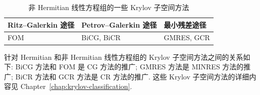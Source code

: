 \begin{table}[H]
\centering
\caption{非 Hermitian 线性方程组的一些 Krylov 子空间方法}\label{tab:nonhermitian-krylov-methods}
\begin{tabular}{lll}\hline
Ritz--Galerkin 途径 & Petrov--Galerkin 途径 & 最小残差途径\\\hline
FOM & BiCG, BiCR & GMRES, GCR\\\hline
\end{tabular}
\end{table}

针对 Hermitian 和非 Hermitian 线性方程组的 Krylov 子空间方法之间的关系如下: BiCG 方法和 FOM 是 CG 方法的推广; GMRES 方法是 MINRES 方法的推广; BiCR 方法和 GCR 方法是 CR 方法的推广. 这些 Krylov 子空间方法的详细内容见 Chapter~\ref{chap:krylov-classification}.
